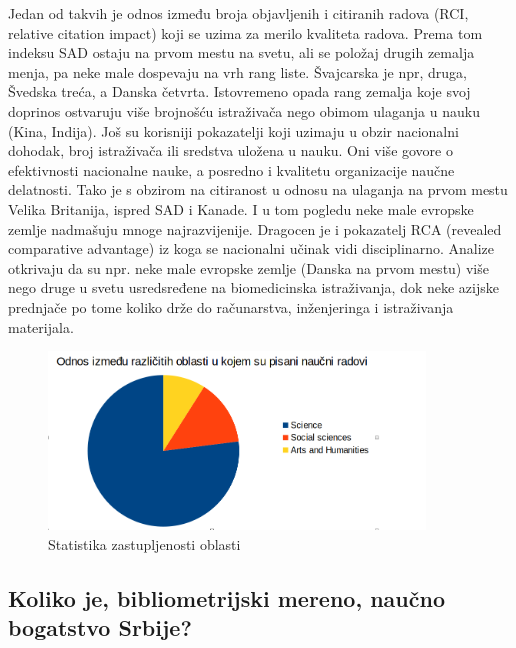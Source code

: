 \documentclass[12pt,a4paper]{article}
\begin{document}
   Jedan od takvih je odnos između broja objavljenih i citiranih radova (RCI, relative citation impact) koji se uzima za merilo kvaliteta radova. Prema tom indeksu SAD ostaju na prvom mestu na svetu, ali se položaj drugih zemalja menja, pa neke male dospevaju na vrh rang liste. Švajcarska je npr, druga, Švedska treća, a Danska četvrta. Istovremeno opada rang zemalja koje svoj doprinos ostvaruju više brojnošću istraživača nego obimom ulaganja u nauku (Kina, Indija). Još su korisniji pokazatelji koji uzimaju u obzir nacionalni dohodak, broj istraživača ili sredstva uložena u nauku. Oni više govore o efektivnosti nacionalne nauke, a posredno i kvalitetu organizacije naučne delatnosti. Tako je s obzirom na citiranost u odnosu na ulaganja na prvom mestu Velika Britanija, ispred SAD i Kanade. I u tom pogledu neke male evropske zemlje nadmašuju mnoge najrazvijenije. Dragocen je i pokazatelj RCA (revealed comparative advantage) iz koga se nacionalni učinak vidi disciplinarno. Analize otkrivaju da su npr. neke male evropske zemlje (Danska na prvom mestu) više nego druge u svetu usredsređene na biomedicinska istraživanja, dok neke azijske prednjače po tome koliko drže do računarstva, inženjeringa i istraživanja materijala. 

    \qquad
\begin{figure} [h]
\centering  
\includegraphics [width=10cm] {slika2.png} 
\caption{Statistika zastupljenosti oblasti}\label{slika2}
\end{figure}  

\newpage
\subsection{\large{\textbf{Koliko je, bibliometrijski mereno, naučno bogatstvo Srbije? }}}
\indent
\end{document}
